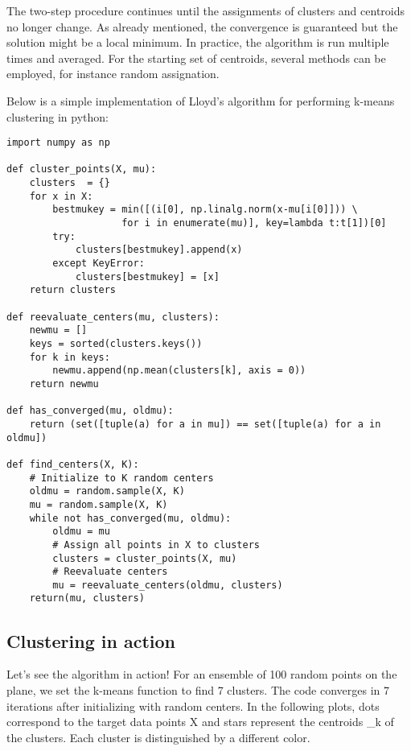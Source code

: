 The two-step procedure continues until the assignments of clusters and centroids no longer change. As already mentioned, the convergence is guaranteed but the solution might be a local minimum. In practice, the algorithm is run multiple times and averaged. For the starting set of centroids, several methods can be employed, for instance random assignation.

Below is a simple implementation of Lloyd’s algorithm for performing k-means clustering in python:
\begin{framed}
\begin{verbatim}
import numpy as np
 
def cluster_points(X, mu):
    clusters  = {}
    for x in X:
        bestmukey = min([(i[0], np.linalg.norm(x-mu[i[0]])) \
                    for i in enumerate(mu)], key=lambda t:t[1])[0]
        try:
            clusters[bestmukey].append(x)
        except KeyError:
            clusters[bestmukey] = [x]
    return clusters
 
def reevaluate_centers(mu, clusters):
    newmu = []
    keys = sorted(clusters.keys())
    for k in keys:
        newmu.append(np.mean(clusters[k], axis = 0))
    return newmu
 
def has_converged(mu, oldmu):
    return (set([tuple(a) for a in mu]) == set([tuple(a) for a in oldmu])
 
def find_centers(X, K):
    # Initialize to K random centers
    oldmu = random.sample(X, K)
    mu = random.sample(X, K)
    while not has_converged(mu, oldmu):
        oldmu = mu
        # Assign all points in X to clusters
        clusters = cluster_points(X, mu)
        # Reevaluate centers
        mu = reevaluate_centers(oldmu, clusters)
    return(mu, clusters)

\end{verbatim}
\end{framed}
\subsection*{Clustering in action}

Let’s see the algorithm in action! For an ensemble of 100 random points on the plane, we set the k-means function to find 7 clusters. The code converges in 7 iterations after initializing with random centers. In the following plots, dots correspond to the target data points X and stars represent the centroids \mu_k of the clusters. Each cluster is distinguished by a different color.

